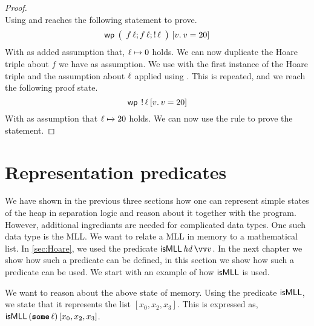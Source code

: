\documentclass[thesis.tex]{subfiles}
\begin{document}
\begin{proof}
\[    \]
    Using  and  reaches the following statement to prove.
    \[
        \wpre{\left(\begin{array}{l}
                f\, \loc; f\, \loc; \deref \loc
            \end{array}\right)}{\Ret \val. \val = 20}
    \]
    With as added assumption that, $\loc \fmapsto 0$ holds. We can now duplicate the Hoare triple about $f$ we have as assumption. We use  with the first instance of the Hoare triple and the assumption about $\ell$ applied using . This is repeated, and we reach the following proof state.
    \[
        \wpre{\deref \loc}{\Ret \val. \val = 20}
    \]
    With as assumption that $\loc \fmapsto 20$ holds. We can now use the  rule to prove the statement.

\end{proof}
\section{Representation predicates}
\label{sec:represpreds}
We have shown in the previous three sections how one can represent simple states of the heap in separation logic and reason about it together with the program. However, additional ingrediants are needed for complicated data types. One such data type is the MLL. We want to relate a MLL in memory to a mathematical list. In \cref{sec:Hoare}, we used the predicate $\isMLL\, \hd\, \vect{v}$. In the next chapter we show how such a predicate can be defined, in this section we show how such a predicate can be used. We start with an example of how $\textsf{\upshape isMLL}$ is used.
\begin{center}
\end{center}
We want to reason about the above state of memory. Using the predicate $\textsf{\upshape isMLL}$, we state that it represents the list $[x_0, x_2, x_3]$. This is expressed as, $\textsf{\upshape isMLL}\,(\operatorname{\texttt{\upshape \bfseries some}}\ell)\,[x_0,x_2,x_3]$.
\end{document}
